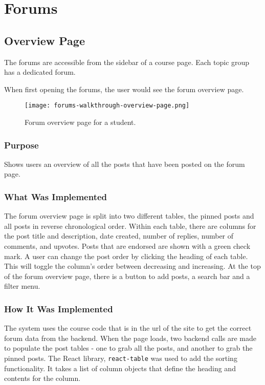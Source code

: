 \section{Forums}

\subsection{Overview Page}
The forums are accessible from the sidebar of a course page. Each topic group has a dedicated forum.

When first opening the forums, the user would see the forum overview page.

\begin{figure}[h!]
    \texttt{[image: forums-walkthrough-overview-page.png]}
    \centering
    \caption{Forum overview page for a student.}
\end{figure}

\subsubsection{Purpose}
Shows users an overview of all the posts that have been posted on the forum page.

\subsubsection{What Was Implemented}
The forum overview page is split into two different tables, the pinned posts and all posts in reverse chronological order.
Within each table, there are columns for the post title and description, date created, number of replies, number of comments, and upvotes.
Posts that are endorsed are shown with a green check mark.
A user can change the post order by clicking the heading of each table. This will toggle the column's order between decreasing and increasing.
At the top of the forum overview page, there is a button to add posts, a search bar and a filter menu.

\subsubsection{How It Was Implemented}
The system uses the course code that is in the url of the site to get the correct forum data from the backend.
When the page loads, two backend calls are made to populate the post tables - one to grab all the posts, and another to grab the pinned posts.
The React library, \texttt{react-table} was used to add the sorting functionality.
It takes a list of column objects that define the heading and contents for the column.

